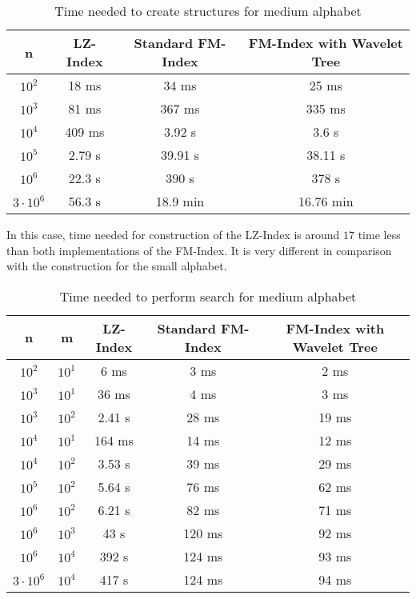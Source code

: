 \begin{table}[H]
\begin{center}
\caption{Time needed to create structures for medium alphabet}
\begin{tabular}{|c|c|c|c|}
\hline
\rowcolor[HTML]{C0C0C0}
n & LZ-Index & Standard FM-Index & FM-Index with Wavelet Tree \\ \hline
$10^{2}$ & 18 ms & 34 ms & 25 ms \\ \hline
$10^{3}$ & 81 ms & 367 ms & 335 ms \\ \hline
$10^{4}$ & 409 ms & 3.92 s & 3.6 s \\ \hline
$10^{5}$ & 2.79 s & 39.91 s & 38.11 s \\ \hline
$10^{6}$ & 22.3 s & 390 s & 378 s \\ \hline
$3 \cdot 10^{6}$ & 56.3 s & 18.9 min & 16.76 min \\ \hline
\end{tabular}
\end{center}
\end{table}

In this case, time needed for construction of the LZ-Index is around $17$ time less than both implementations of the FM-Index. It is very different in comparison with the construction for the small alphabet.

\begin{table}[H]
\begin{center}
\caption{Time needed to perform search for medium alphabet}
\begin{tabular}{|c|c|c|c|c|}
\hline
\rowcolor[HTML]{C0C0C0}
n & m & LZ-Index & Standard FM-Index & FM-Index with Wavelet Tree \\ \hline
$10^{2}$ & $10^{1}$ & 6 ms & 3 ms & 2 ms \\ \hline
$10^{3}$ & $10^{1}$ & 36 ms & 4 ms & 3 ms \\ \hline
$10^{3}$ & $10^{2}$ & 2.41 s & 28 ms & 19 ms \\ \hline
$10^{4}$ & $10^{1}$ & 164 ms & 14 ms & 12 ms \\ \hline
$10^{4}$ & $10^{2}$ & 3.53 s & 39 ms & 29 ms \\ \hline
$10^{5}$ & $10^{2}$ & 5.64 s & 76 ms & 62 ms \\ \hline
$10^{6}$ & $10^{2}$ & 6.21 s & 82 ms & 71 ms \\ \hline
$10^{6}$ & $10^{3}$ & 43 s & 120 ms & 92 ms \\ \hline
$10^{6}$ & $10^{4}$ & 392 s & 124 ms & 93 ms \\ \hline
$3 \cdot 10^{6}$ & $10^{4}$ & 417 s & 124 ms & 94 ms \\ \hline
\end{tabular}
\end{center}
\end{table}

